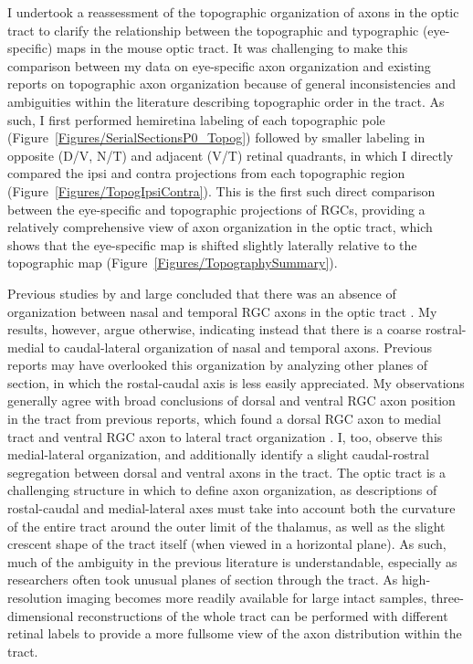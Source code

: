 I undertook a reassessment of the topographic organization of axons in the optic tract to clarify the relationship between the topographic and typographic (eye-specific) maps in the mouse optic tract.
It was challenging to make this comparison between my data on eye-specific axon organization and existing reports on topographic axon organization because of general inconsistencies and ambiguities within the literature describing topographic order in the tract.
As such, I first performed hemiretina labeling of each topographic pole (Figure~\ref{Figures/SerialSectionsP0_Topog}) followed by smaller labeling in opposite (D/V, N/T) and adjacent (V/T) retinal quadrants, in which I directly compared the ipsi and contra projections from each topographic region (Figure~\ref{Figures/TopogIpsiContra}).
This is the first such direct comparison between the eye-specific and topographic projections of RGCs, providing a relatively comprehensive view of axon organization in the optic tract, which shows that the eye-specific map is shifted slightly laterally relative to the topographic map (Figure~\ref{Figures/TopographySummary}).

Previous studies by and large concluded that there was an absence of organization between nasal and temporal RGC axons in the optic tract \cite{chan1994changes,plas2005pretarget,reese1993reestablishment}.
My results, however, argue otherwise, indicating instead that there is a coarse rostral-medial to caudal-lateral organization of nasal and temporal axons.
Previous reports may have overlooked this organization by analyzing other planes of section, in which the rostal-caudal axis is less easily appreciated.
My observations generally agree with broad conclusions of dorsal and ventral RGC axon position in the tract from previous reports, which found a dorsal RGC axon to medial tract and ventral RGC axon to lateral tract organization \cite{chan1999changes,chan1994changes,plas2005pretarget,reese1993reestablishment,reese1990fibre,reh1983organization,torrealba1982studies}.%
I, too, observe this medial-lateral organization, and additionally identify a slight caudal-rostral segregation between dorsal and ventral axons in the tract.
The optic tract is a challenging structure in which to define axon organization, as descriptions of rostal-caudal and medial-lateral axes must take into account both the curvature of the entire tract around the outer limit of the thalamus, as well as the slight crescent shape of the tract itself (when viewed in a horizontal plane).
As such, much of the ambiguity in the previous literature is understandable, especially as researchers often took unusual planes of section through the tract.
As high-resolution imaging becomes more readily available for large intact samples, three-dimensional reconstructions of the whole tract can be performed with different retinal labels to provide a more fullsome view of the axon distribution within the tract.


